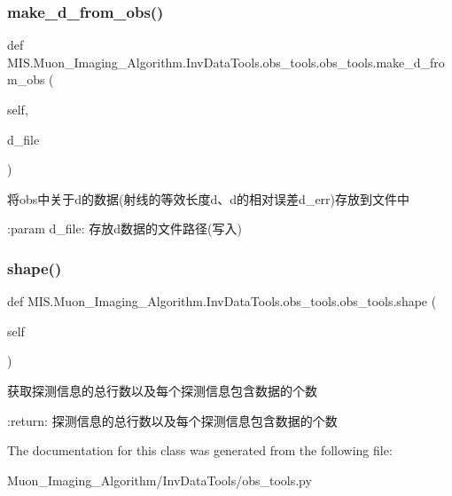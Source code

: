 \subsubsection{\texorpdfstring{make\+\_\+d\+\_\+from\+\_\+obs()}{make\_d\_from\_obs()}}
{\footnotesize\ttfamily def M\+I\+S.\+Muon\+\_\+\+Imaging\+\_\+\+Algorithm.\+Inv\+Data\+Tools.\+obs\+\_\+tools.\+obs\+\_\+tools.\+make\+\_\+d\+\_\+from\+\_\+obs (\begin{DoxyParamCaption}\item[{}]{self,  }\item[{}]{d\+\_\+file }\end{DoxyParamCaption})}

\begin{DoxyVerb}将obs中关于d的数据(射线的等效长度d、d的相对误差d_err)存放到文件中

:param d_file: 存放d数据的文件路径(写入)
\end{DoxyVerb}
 \mbox{\label{classMIS_1_1Muon__Imaging__Algorithm_1_1InvDataTools_1_1obs__tools_1_1obs__tools_ad0eaaf1cf6b05188e6255b434461fac3}} 
\subsubsection{\texorpdfstring{shape()}{shape()}}
{\footnotesize\ttfamily def M\+I\+S.\+Muon\+\_\+\+Imaging\+\_\+\+Algorithm.\+Inv\+Data\+Tools.\+obs\+\_\+tools.\+obs\+\_\+tools.\+shape (\begin{DoxyParamCaption}\item[{}]{self }\end{DoxyParamCaption})}

\begin{DoxyVerb}获取探测信息的总行数以及每个探测信息包含数据的个数

:return: 探测信息的总行数以及每个探测信息包含数据的个数
\end{DoxyVerb}
 

The documentation for this class was generated from the following file\+:\begin{DoxyCompactItemize}
\item 
Muon\+\_\+\+Imaging\+\_\+\+Algorithm/\+Inv\+Data\+Tools/obs\+\_\+tools.\+py\end{DoxyCompactItemize}
